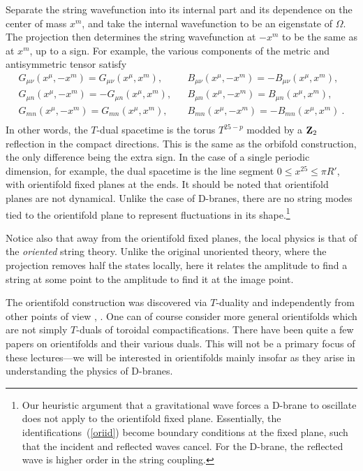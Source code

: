 \documentclass[12pt]{article}
\def\bea{\begin{eqnarray}}
\def\eea{\end{eqnarray}}
\def\Z{{\bf Z}}
\begin{document}
Separate the string wavefunction into its internal
part and its dependence on the center of mass $x^m$, and take the internal
wavefunction to be an eigenstate of $\Omega$.  The projection then
determines the string wavefunction at $-x^m$ to be the same as at $x^m$, up
to a sign.  For example, the various components of the metric and
antisymmetric  tensor satisfy
\bea
G_{\mu\nu}(x^\mu,-x^m) = G_{\mu\nu}(x^\mu,x^m),&&
B_{\mu\nu}(x^\mu,-x^m) = -B_{\mu\nu}(x^\mu,x^m), \nonumber\\
G_{\mu n}(x^\mu,-x^m) = -G_{\mu n}(x^\mu,x^m),&&
B_{\mu n}(x^\mu,-x^m) = B_{\mu n}(x^\mu,x^m), \nonumber\\
G_{mn}(x^\mu,-x^m) = G_{mn}(x^\mu,x^m),&&
B_{mn}(x^\mu,-x^m) = -B_{mn}(x^\mu,x^m)\ . \\ \label{oriid}
\eea
In other words, the $T$-dual spacetime is the torus
$T^{25-p}$ modded by a $\Z_2$ reflection in the compact directions.
This is the same as the orbifold construction, the only difference
being the extra sign.
In the case of a single periodic
dimension, for example, the dual spacetime is the line segment $0 \leq x^{25}
\leq
\pi R'$,  with orientifold fixed planes at the ends.  It should be noted that
orientifold planes are not dynamical.  Unlike the case of D-branes, there are
no string modes tied to the orientifold plane to represent fluctuations in its
shape.\footnote{Our heuristic argument that a gravitational wave forces a
D-brane to oscillate does not apply to the orientifold fixed plane. 
Essentially, the identifications~(\ref{oriid}) become boundary conditions at
the fixed plane, such that the incident and reflected waves cancel.  For the
D-brane, the reflected wave is higher order in the string coupling.}  

Notice also that away from
the orientifold fixed planes, the local physics is that of the {\it
oriented} string theory.  Unlike the original unoriented theory, where the
projection removes half the states locally, here it relates the
amplitude to find a string at some point to the amplitude to find it at the
image point.

The orientifold construction was discovered via $T$-duality \cite{dlp} and
independently from other points of
view \cite{opentwist}, \cite{laterc}. One can of course consider more
general orientifolds which are not simply
$T$-duals of toroidal compactifications.  There have been quite a few papers
on orientifolds and their various duals.  This will not be a primary focus of
these lectures---we will be interested in orientifolds mainly insofar as they
arise in understanding the physics of D-branes.
\end{document}

